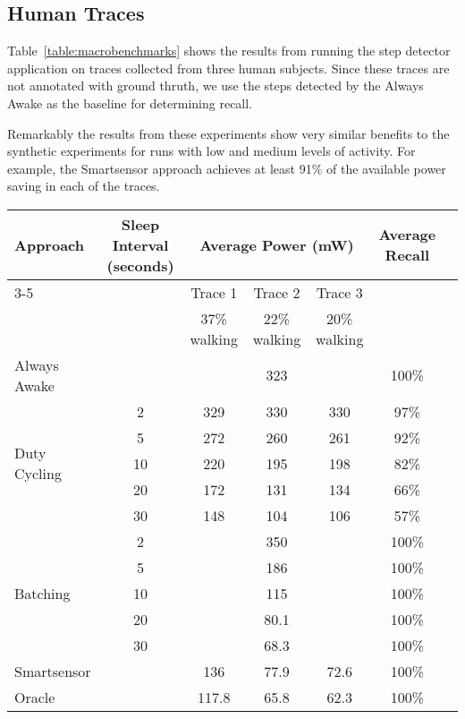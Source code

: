 \subsection{Human Traces}

Table~\ref{table:macrobenchmarks} shows the results from running the
step detector application on traces collected from three human
subjects.  Since these traces are not annotated with ground thruth, we
use the steps detected by the Always Awake as the baseline for
determining recall.

Remarkably the results from these experiments show very similar
benefits to the synthetic experiments for runs with low and medium
levels of activity.  For example, the Smartsensor approach achieves
at least 91\% of the available power saving in each of the traces.

\begin{table*}[t]
\centering
{\small
    \begin{tabular}{|l|c|c|c|c|c|c|}
    \hline
	\multirow{2}{*}{Approach}		& \multirow{2}{*}{\parbox{2.2cm}{Sleep Interval (seconds)}}
												& \multicolumn{3}{c|}{\parbox{5.2cm}{Average Power (mW)}}
																								& \multirow{2}{*}{\parbox{1.5cm}{Average Recall}} \\ \cline{3-5}
									&			& Trace 1		& Trace 2		& Trace 3 		& 							\\ 
									&			& 37\% walking	& 22\% walking		& 20\% walking		& \\ \hline
	Always Awake					& 			& \multicolumn{3}{c|}{323} 						& 100\% \\ \hline
	\multirow{5}{*}{Duty Cycling}	& 2			& 329			& 330			& 330			& 97\%	\\ \cline{2-6}
									& 5			& 272			& 260			& 261			& 92\%	\\ \cline{2-6}
									& 10		& 220			& 195			& 198			& 82\%	\\ \cline{2-6}
									& 20		& 172			& 131			& 134			& 66\%	\\ \cline{2-6}
									& 30		& 148			& 104			& 106			& 57\%	\\ \hline
	\multirow{5}{*}{Batching}		& 2			& \multicolumn{3}{c|}{350} 						& 100\% \\ \cline{2-6}
									& 5			& \multicolumn{3}{c|}{186} 						& 100\% \\ \cline{2-6}
	 								& 10		& \multicolumn{3}{c|}{115} 						& 100\% \\ \cline{2-6}
	 								& 20		& \multicolumn{3}{c|}{80.1} 					& 100\% \\ \cline{2-6}
	 								& 30		& \multicolumn{3}{c|}{68.3} 					& 100\% \\ \hline
	Smartsensor				&			& 136			& 77.9			& 72.6			& 100\% \\ \hline
	Oracle				&			& 117.8			& 65.8			& 62.3			& 100\% \\ \hline



    \end{tabular}
}
	\caption{Event recall and average power for human traces.}
	\label{table:macrobenchmarks}
\end{table*}


